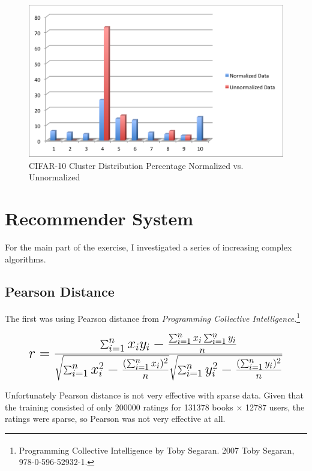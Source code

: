 \documentclass[11pt, oneside]{article}   	%
\begin{document}
\begin{figure}[h!]
\centering
\includegraphics[scale=0.6]{normalvsunnormal}
\caption{CIFAR-10 Cluster Distribution Percentage Normalized vs. Unnormalized}
\end{figure}


\clearpage

\section*{Recommender System}

For the main part of the exercise, I investigated a series of increasing complex algorithms. 

\subsection*{Pearson Distance}

The first was using Pearson distance from \emph{Programming Collective Intelligence}.\footnote{Programming Collective Intelligence by Toby Segaran. \textsuperscript{\textcopyright} 2007 Toby Segaran, 978-0-596-52932-1.}

\begin{equation}
\mathlarger{\mathlarger{\mathlarger{
r = \frac{\sum_{i=1}^n x_iy_i - \frac{\sum_{i=1}^n x_i \sum_{i=1}^n y_i} {n}} 
     { \sqrt{\sum_{i=1}^n x_i^2 - \frac{(\sum_{i=1}^n x_i)^2}{n}} 
        \sqrt{\sum_{i=1}^n y_i^2 - \frac{(\sum_{i=1}^n y_i)^2}{n}} }
}}}
\end{equation}

Unfortunately Pearson distance is not very effective with sparse data. Given that the training consisted of only 200000 ratings for 131378 books $\times$ 12787 users, the ratings were sparse, so Pearson was not very effective at all.
\end{document}
